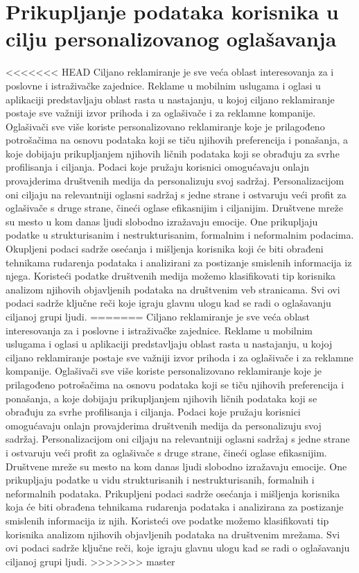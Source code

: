 \documentclass[a4paper]{article}
\begin{document}
	\section{Prikupljanje podataka korisnika u cilju personalizovanog oglašavanja}
	\label{sec:podaci}
<<<<<<< HEAD
	Ciljano reklamiranje je sve veća oblast interesovanja za i poslovne i istraživačke zajednice. Reklame u mobilnim uslugama i oglasi u aplikaciji predstavljaju oblast rasta u nastajanju, u kojoj ciljano reklamiranje postaje sve važniji izvor prihoda i za oglašivače i za reklamne kompanije. Oglašivači sve više koriste personalizovano reklamiranje koje je prilagođeno potrošačima na osnovu podataka koji se tiču njihovih preferencija i ponašanja, a koje dobijaju prikupljanjem njihovih ličnih podataka koji se obrađuju za svrhe profilisanja i ciljanja. Podaci koje pružaju korisnici omogućavaju onlajn provajderima društvenih medija da personalizuju svoj sadržaj. Personalizacijom oni ciljaju na relevantniji oglasni sadržaj s jedne strane i ostvaruju veći profit za oglašivače s druge strane, čineći oglase efikasnijim i ciljanijim.
	Društvene mreže su mesto u kom danas ljudi slobodno izražavaju emocije. One prikupljaju podatke u strukturisanim i nestrukturisanim, formalnim i neformalnim podacima. Okupljeni podaci sadrže osećanja i mišljenja korisnika koji će biti obrađeni tehnikama rudarenja podataka i analizirani za postizanje smislenih informacija iz njega. Koristeći podatke društvenih medija možemo klasifikovati tip korisnika analizom njihovih objavljenih podataka na društvenim veb stranicama. Svi ovi podaci sadrže ključne reči koje igraju glavnu ulogu kad se radi o oglašavanju ciljanoj grupi ljudi.
=======
	Ciljano reklamiranje je sve veća oblast interesovanja za i poslovne i istraživačke zajednice. Reklame u mobilnim uslugama i oglasi u aplikaciji predstavljaju oblast rasta u nastajanju, u kojoj ciljano reklamiranje postaje sve važniji izvor prihoda i za oglašivače i za reklamne kompanije. Oglašivači sve više koriste personalizovano reklamiranje koje je prilagođeno potrošačima na osnovu podataka koji se tiču njihovih preferencija i ponašanja, a koje dobijaju prikupljanjem njihovih ličnih podataka koji se obrađuju za svrhe profilisanja i ciljanja. Podaci koje pružaju korisnici omogućavaju onlajn provajderima društvenih medija da personalizuju svoj sadržaj. Personalizacijom oni ciljaju na relevantniji oglasni sadržaj s jedne strane i ostvaruju veći profit za oglašivače s druge strane, čineći oglase efikasnijim.
	Društvene mreže su mesto na kom danas ljudi slobodno izražavaju emocije. One prikupljaju podatke u vidu strukturisanih i nestrukturisanih, formalnih i neformalnih podataka. Prikupljeni podaci sadrže osećanja i mišljenja korisnika koja će biti obrađena tehnikama rudarenja podataka i analizirana za postizanje smislenih informacija iz njih. Koristeći ove podatke možemo klasifikovati tip korisnika analizom njihovih objavljenih podataka na društvenim mrežama. Svi ovi podaci sadrže ključne reči, koje igraju glavnu ulogu kad se radi o oglašavanju ciljanoj grupi ljudi.
>>>>>>> master
	
\end{document}
